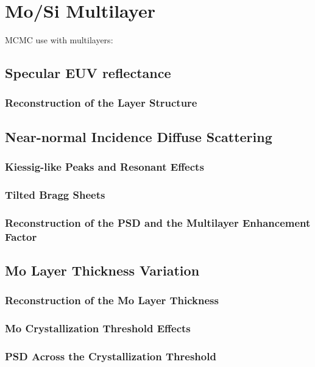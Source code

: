 \chapter{Mo/Si Multilayer}
\cite{haase_role_2014}
MCMC use with multilayers: \cite{hobson_markov-chain_2004}

\section{Specular EUV reflectance}

\subsection{Reconstruction of the Layer Structure}

\section{Near-normal Incidence Diffuse Scattering}

\subsection{Kiessig-like Peaks and Resonant Effects}

\subsection{Tilted Bragg Sheets}

\subsection{Reconstruction of the PSD and the Multilayer Enhancement Factor}

\section{Mo Layer Thickness Variation}

\subsection{Reconstruction of the Mo Layer Thickness}

\subsection{Mo Crystallization Threshold Effects}

\subsection{PSD Across the Crystallization Threshold}